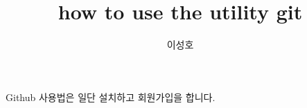 \documentclass{report}
\author{이성호}
\title{how to use the utility git}
\begin{document}
 \maketitle
 Github 사용법은 일단 설치하고 회원가입을 합니다.
\end{document}
